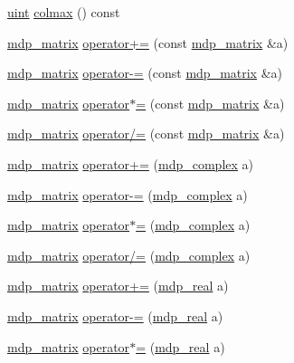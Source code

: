 \begin{DoxyCompactItemize}
\item 
\hyperlink{mdp__global__vars_8h_a91ad9478d81a7aaf2593e8d9c3d06a14}{uint} \hyperlink{classmdp__matrix_ad6bd61c5c0b5fa79b527d752e08e34ff}{colmax} () const
\item 
\hyperlink{classmdp__matrix}{mdp\+\_\+matrix} \hyperlink{classmdp__matrix_a44177e84f9b728933675f171ac481a1c}{operator+=} (const \hyperlink{classmdp__matrix}{mdp\+\_\+matrix} \&a)
\item 
\hyperlink{classmdp__matrix}{mdp\+\_\+matrix} \hyperlink{classmdp__matrix_aaceb320e98a01a83350685591657861f}{operator-\/=} (const \hyperlink{classmdp__matrix}{mdp\+\_\+matrix} \&a)
\item 
\hyperlink{classmdp__matrix}{mdp\+\_\+matrix} \hyperlink{classmdp__matrix_a08052286856ff5fe01cc3cbad6553eb2}{operator$\ast$=} (const \hyperlink{classmdp__matrix}{mdp\+\_\+matrix} \&a)
\item 
\hyperlink{classmdp__matrix}{mdp\+\_\+matrix} \hyperlink{classmdp__matrix_a0c1945c09ca3bea26e1096253b49a25d}{operator/=} (const \hyperlink{classmdp__matrix}{mdp\+\_\+matrix} \&a)
\item 
\hyperlink{classmdp__matrix}{mdp\+\_\+matrix} \hyperlink{classmdp__matrix_a1021c838b49375a54f533fa97e27b742}{operator+=} (\hyperlink{classmdp__complex}{mdp\+\_\+complex} a)
\item 
\hyperlink{classmdp__matrix}{mdp\+\_\+matrix} \hyperlink{classmdp__matrix_a5512747a08a90de54f0291bb86fd3b53}{operator-\/=} (\hyperlink{classmdp__complex}{mdp\+\_\+complex} a)
\item 
\hyperlink{classmdp__matrix}{mdp\+\_\+matrix} \hyperlink{classmdp__matrix_abbab629aca4a06ab60a40087c3ddfe78}{operator$\ast$=} (\hyperlink{classmdp__complex}{mdp\+\_\+complex} a)
\item 
\hyperlink{classmdp__matrix}{mdp\+\_\+matrix} \hyperlink{classmdp__matrix_aab26bb8bce6bb9f9207e2776297c1f8d}{operator/=} (\hyperlink{classmdp__complex}{mdp\+\_\+complex} a)
\item 
\hyperlink{classmdp__matrix}{mdp\+\_\+matrix} \hyperlink{classmdp__matrix_ae2bc2fbd5f22c9a5255995710ca30c35}{operator+=} (\hyperlink{mdp__global__vars_8h_a69d96b74c791e0bbdb888b3913a69450}{mdp\+\_\+real} a)
\item 
\hyperlink{classmdp__matrix}{mdp\+\_\+matrix} \hyperlink{classmdp__matrix_a2b4c3da54d025ee8d8b48acfc8cc4702}{operator-\/=} (\hyperlink{mdp__global__vars_8h_a69d96b74c791e0bbdb888b3913a69450}{mdp\+\_\+real} a)
\item 
\hyperlink{classmdp__matrix}{mdp\+\_\+matrix} \hyperlink{classmdp__matrix_ae933b4a3f23b00dcd22f0fcf4c80379d}{operator$\ast$=} (\hyperlink{mdp__global__vars_8h_a69d96b74c791e0bbdb888b3913a69450}{mdp\+\_\+real} a)

\end{DoxyCompactItemize}
